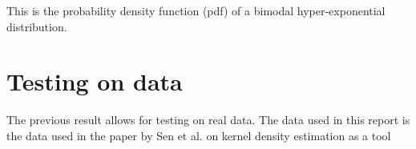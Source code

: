 \documentclass[11pt]{paper}
\begin{document}
This is the probability density function (pdf) of a bimodal hyper-exponential distribution.

\section{Testing on data}
The previous result allows for testing on real data.  The data used in this report is the data used in the paper by Sen et al. \cite{} on kernel density estimation as a tool 
\end{document}
